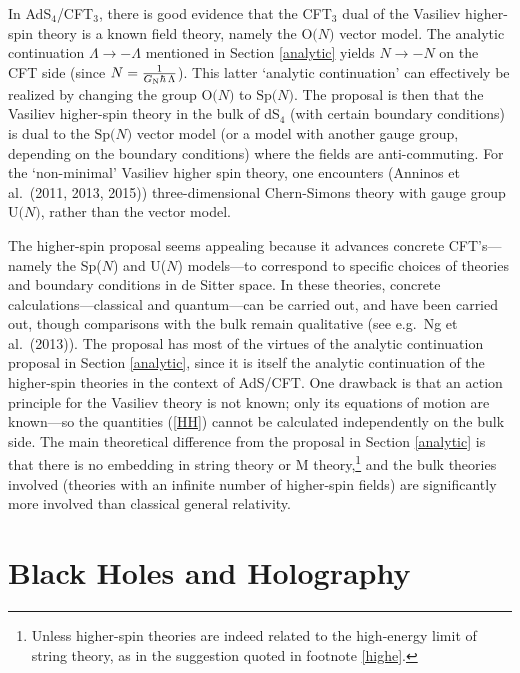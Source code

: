 \documentclass[12pt]{article}
\def\L{\Lambda}
\renewcommand{\^}[1]{\hat{#1}}
\newcommand{\tn}[1]{\mbox{\tiny #1}}
\newcommand{\eq}[1]{(\ref{#1})}
\begin{document}
In AdS$_4$/CFT$_3$, there is good evidence that the CFT$_3$ dual of the Vasiliev higher-spin theory is a known field theory, namely the $\mbox{O($N$)}$ vector model. The analytic continuation $\L\rightarrow-\L$ mentioned in Section \ref{analytic} yields $N\rightarrow-N$ on the CFT side (since $N={1\over G_{\tn{N}}\hbar\,\L}$). This latter `analytic continuation' can effectively be realized by changing the group $\mbox{O($N$)}$ to $\mbox{Sp($N$)}$. The proposal is then that the Vasiliev higher-spin theory in the bulk of dS$_4$ (with certain boundary conditions) is dual to the $\mbox{Sp($N$)}$ vector model (or a model with another gauge group, depending on the boundary conditions)  where the fields are anti-commuting. For the `non-minimal' Vasiliev higher spin theory, one encounters (Anninos et al.~(2011, 2013, 2015)) three-dimensional Chern-Simons theory with gauge group $\mbox{U($N$)}$, rather than the vector model. 

The higher-spin proposal seems appealing because it advances concrete CFT's---namely the Sp($N$) and U($N$) models---to correspond to specific choices of theories and boundary conditions in de Sitter space. In these theories, concrete calculations---classical and quantum---can be carried out, and have been carried out, though comparisons with the bulk remain qualitative (see e.g.~Ng et al.~(2013)). The proposal has most of the virtues of the analytic continuation proposal in Section \ref{analytic}, since it is itself the analytic continuation of the higher-spin theories in the context of AdS/CFT. One drawback is that an action principle for the Vasiliev theory is not known; only its equations of motion are known---so the quantities \eq{HH} cannot be calculated independently on the bulk side. The main theoretical difference from the proposal in Section \ref{analytic} is that there is no embedding in string theory or M theory,\footnote{Unless higher-spin theories are indeed related to the high-energy limit of string theory, as in the suggestion quoted in footnote \ref{highe}.} and the bulk theories involved (theories with an infinite number of higher-spin fields) are significantly more involved than classical general relativity. 

\section{Black Holes and Holography}\label{BHhology}
\end{document}
